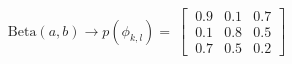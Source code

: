 \documentclass[preview]{standalone}
\begin{document}
\begin{align*}
\text{Beta}(a,b) \longrightarrow p(\phi_{k,l})=\
                       \begin{bmatrix}\
                      0.9 & 0.1 & 0.7 \\\
                      0.1 & 0.8 & 0.5 \\\
                      0.7 & 0.5 & 0.2 \end{bmatrix}
\end{align*}
\end{document}
